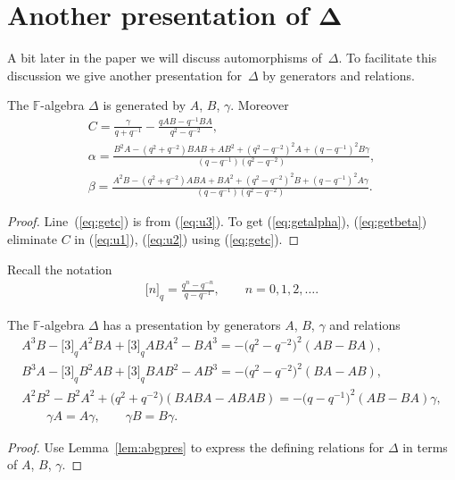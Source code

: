 \section[Another presentation of $\Delta$]{Another presentation of $\boldsymbol{\Delta}$}


A bit later in the paper
we will discuss automorphisms of~$\Delta $.
To facilitate this discussion
we give
another presentation for~$\Delta $ by generators and relations.

\begin{Lemma}
\label{lem:abgpres}
The $\mathbb F$-algebra $\Delta $ is generated by
$A$, $B$, $\gamma$. Moreover
\begin{gather}
C  =  \frac{\gamma}{q+q^{-1}}
-\frac{qAB-q^{-1}BA}{q^2-q^{-2}},
\label{eq:getc}
\\
\alpha  =  \frac{B^2A-(q^2+q^{-2})BAB+AB^2+
(q^2-q^{-2})^2A+(q-q^{-1})^2B\gamma}{(q-q^{-1})(q^2-q^{-2})},
\label{eq:getalpha}
\\
\beta  =  \frac{A^2B-(q^2+q^{-2})ABA+BA^2+
(q^2-q^{-2})^2B+(q-q^{-1})^2A\gamma}{(q-q^{-1})(q^2-q^{-2})}.
\label{eq:getbeta}
\end{gather}
\end{Lemma}

\begin{proof}\sloppy
Line~(\ref{eq:getc})
is from (\ref{eq:u3}).
To get
(\ref{eq:getalpha}),
(\ref{eq:getbeta})
eliminate $C$ in
(\ref{eq:u1}),
(\ref{eq:u2})
using
(\ref{eq:getc}).
\end{proof}

 Recall the notation
\begin{gather*}
\lbrack n \rbrack_q= \frac{q^n-q^{-n}}{q-q^{-1}}, \qquad
n=0,1,2,\ldots.
\end{gather*}




{\samepage

\begin{Theorem}
\label{prop:altpres}
The $\mathbb F$-algebra $\Delta $ has a  presentation by generators
$A$, $B$, $\gamma$ and
relations
 \begin{gather*}
 A^3B-\lbrack 3\rbrack_q A^2BA+\lbrack 3\rbrack_q ABA^2-BA^3
= -\big(q^2-q^{-2}\big)^2(AB-BA),
\\
 B^3A-\lbrack 3\rbrack_q B^2AB+\lbrack 3\rbrack_q BAB^2-AB^3
= -\big(q^2-q^{-2}\big)^2(BA-AB),
\\
 A^2B^2-B^2A^2+\big(q^2+q^{-2}\big)(BABA-ABAB) = -\big(q-q^{-1}\big)^2(AB-BA)\gamma,
\\
  \qquad \gamma A = A \gamma,   \qquad \gamma B=B \gamma.
 \end{gather*}
\end{Theorem}

\begin{proof}
Use Lemma~\ref{lem:abgpres} to
express the def\/ining relations
for $\Delta $ in terms of $A$, $B$, $\gamma$.
\end{proof}}

